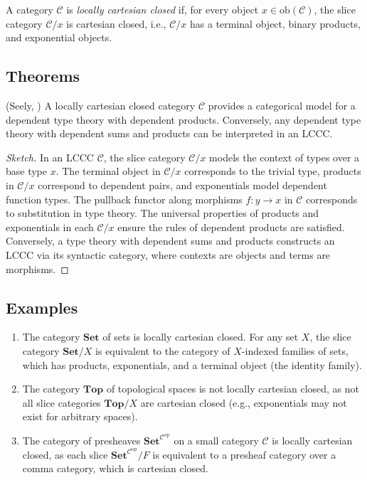 \documentclass{article}
\begin{document}
\begin{definition}
A category $\mathcal{C}$ is \emph{locally cartesian closed} if, for every object $x \in \mathrm{ob}(\mathcal{C})$, the slice category $\mathcal{C}/x$ is cartesian closed, i.e., $\mathcal{C}/x$ has a terminal object, binary products, and exponential objects.
\end{definition}

\subsection{Theorems}

\begin{theorem}
\label{thm:lccc-type-theory}
(Seely, \cite{Seely87}) A locally cartesian closed category $\mathcal{C}$ provides a categorical model for a dependent type theory with dependent products. Conversely, any dependent type theory with dependent sums and products can be interpreted in an LCCC.
\end{theorem}

\begin{proof}[Sketch]
In an LCCC $\mathcal{C}$, the slice category $\mathcal{C}/x$ models the context of types over a base type $x$. The terminal object in $\mathcal{C}/x$ corresponds to the trivial type, products in $\mathcal{C}/x$ correspond to dependent pairs, and exponentials model dependent function types. The pullback functor along morphisms $f : y \to x$ in $\mathcal{C}$ corresponds to substitution in type theory. The universal properties of products and exponentials in each $\mathcal{C}/x$ ensure the rules of dependent products are satisfied. Conversely, a type theory with dependent sums and products constructs an LCCC via its syntactic category, where contexts are objects and terms are morphisms.
\end{proof}


\subsection{Examples}

\begin{enumerate}
    \item The category $\mathbf{Set}$ of sets is locally cartesian closed. For any set $X$, the slice category $\mathbf{Set}/X$ is equivalent to the category of $X$-indexed families of sets, which has products, exponentials, and a terminal object (the identity family).
    \item The category $\mathbf{Top}$ of topological spaces is not locally cartesian closed, as not all slice categories $\mathbf{Top}/X$ are cartesian closed (e.g., exponentials may not exist for arbitrary spaces).
    \item The category of presheaves $\mathbf{Set}^{\mathcal{C}^{\mathrm{op}}}$ on a small category $\mathcal{C}$ is locally cartesian closed, as each slice $\mathbf{Set}^{\mathcal{C}^{\mathrm{op}}}/F$ is equivalent to a presheaf category over a comma category, which is cartesian closed.
\end{enumerate}
\end{document}
